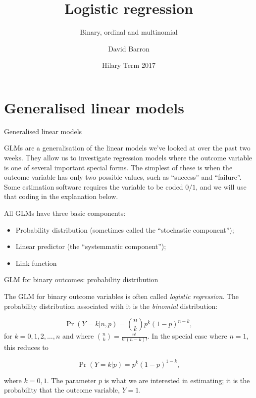 \documentclass[10pt,ignorenonframetext,]{beamer}
\title{Logistic regression}
\subtitle{Binary, ordinal and multinomial}
\author{David Barron}
\date{Hilary Term 2017}
\providecommand{\tightlist}{%
\setlength{\itemsep}{0pt}\setlength{\parskip}{0pt}}
\begin{document}
\frame{\titlepage}

\section{Generalised linear models}\label{generalised-linear-models}

\begin{frame}{Generalised linear models}

GLMs are a generalisation of the linear models we've looked at over the
past two weeks. They allow us to investigate regression models where the
outcome variable is one of several important special forms. The simplest
of these is when the outcome variable has only two possible values, such
as ``success'' and ``failure''. Some estimation software requires the
variable to be coded \(0/1\), and we will use that coding in the
explanation below.

All GLMs have three basic components:

\begin{itemize}
\tightlist
\item
  Probability distribution (sometimes called the ``stochastic
  component'');
\item
  Linear predictor (the ``systemmatic component'');
\item
  Link function
\end{itemize}

\end{frame}

\begin{frame}{GLM for binary outcomes: probability distribution}

The GLM for binary outcome variables is often called \emph{logistic
regression}. The probability distribution associated with it is the
\emph{binomial} distribution:

\[
\Pr(Y = k|n, p) = \binom{n}{k} p^k (1-p)^{n - k},
\] for \(k = 0, 1, 2, \dots, n\) and where
\(\binom{n}{k} = \frac{n!}{k! (n-k)!}\). In the special case where
\(n = 1\), this reduces to

\[
\Pr(Y = k|p) = p^k (1 - p)^{1 - k},
\]

where \(k = 0,1\). The parameter \(p\) is what we are interested in
estimating; it is the probability that the outcome variable, \(Y = 1.\)

\end{frame}
\end{document}
